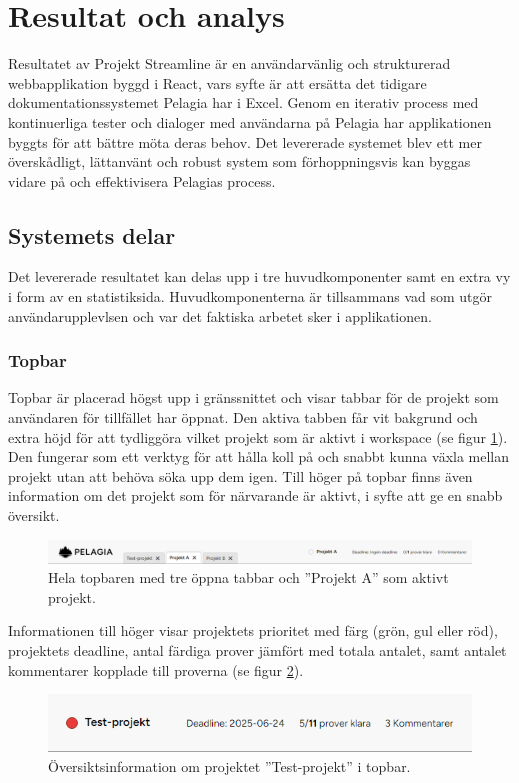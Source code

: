 \section{Resultat och analys}
Resultatet av Projekt Streamline är en användarvänlig och strukturerad webbapplikation byggd i React, vars syfte är att ersätta det tidigare dokumentationssystemet Pelagia har i Excel.
Genom en iterativ process med kontinuerliga tester och dialoger med användarna på Pelagia har applikationen byggts för att bättre möta deras behov. Det levererade systemet blev
ett mer överskådligt, lättanvänt och robust system som förhoppningsvis kan byggas vidare på och effektivisera Pelagias process.
\subsection{Systemets delar}
Det levererade resultatet kan delas upp i tre huvudkomponenter samt en extra vy i form av en statistiksida. Huvudkomponenterna är tillsammans vad som utgör användarupplevlsen
och var det faktiska arbetet sker i applikationen.
\subsubsection{Topbar}
Topbar är placerad högst upp i gränssnittet och visar tabbar för de projekt som användaren för tillfället har öppnat. Den aktiva tabben får vit bakgrund
och extra höjd för att tydliggöra vilket projekt som är aktivt i workspace (se figur \ref{fig:topbar}).
Den fungerar som ett verktyg för att hålla koll på och snabbt kunna växla mellan projekt utan att behöva söka upp dem igen.
Till höger på topbar finns även information om det projekt som för närvarande är aktivt, i syfte att ge en snabb översikt.

\begin{figure}[H]
    \centering
    \includegraphics[width=1\linewidth]{images/topbar.PNG}
    \caption{Hela topbaren med tre öppna tabbar och ''Projekt A'' som aktivt projekt.}
    \label{fig:topbar}
\end{figure}

\noindent Informationen till höger visar projektets prioritet med färg (grön, gul eller röd),
projektets deadline, antal färdiga prover jämfört med totala antalet, samt antalet kommentarer kopplade till proverna
(se figur \ref{fig:topbar_info}).

\begin{figure}[H]
    \centering
    \includegraphics[width=0.8\linewidth]{images/topbar_h_info.PNG}
    \caption{Översiktsinformation om projektet ''Test-projekt'' i topbar.}
    \label{fig:topbar_info}
\end{figure}


